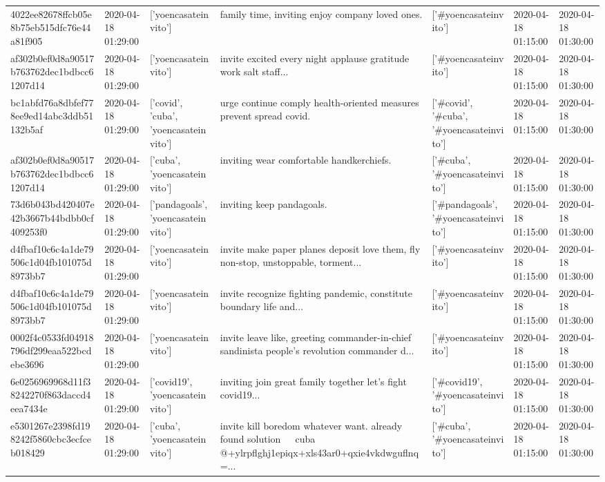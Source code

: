 \begin{tabular}{lllllll}
4022ee82678ffcb05e8b75eb515dfc76e44a81f905 & 2020-04-18 01:29:00 & ['yoencasateinvito'] & family time, inviting enjoy company loved ones. & ['#yoencasateinvito'] & 2020-04-18 01:15:00 & 2020-04-18 01:30:00 \\
af302b0ef0d8a90517b763762dec1bdbcc61207d14 & 2020-04-18 01:29:00 & ['yoencasateinvito'] & invite excited every night applause gratitude work salt staff... & ['#yoencasateinvito'] & 2020-04-18 01:15:00 & 2020-04-18 01:30:00 \\
bc1abfd76a8dbfef778ee9ed14abc3ddb51132b5af & 2020-04-18 01:29:00 & ['covid', 'cuba', 'yoencasateinvito'] & urge continue comply health-oriented measures prevent spread covid. & ['#covid', '#cuba', '#yoencasateinvito'] & 2020-04-18 01:15:00 & 2020-04-18 01:30:00 \\
af302b0ef0d8a90517b763762dec1bdbcc61207d14 & 2020-04-18 01:29:00 & ['cuba', 'yoencasateinvito'] & inviting wear comfortable handkerchiefs. & ['#cuba', '#yoencasateinvito'] & 2020-04-18 01:15:00 & 2020-04-18 01:30:00 \\
73d6b043bd420407e42b3667b44bdbb0cf409253f0 & 2020-04-18 01:29:00 & ['pandagoals', 'yoencasateinvito'] & inviting keep pandagoals. & ['#pandagoals', '#yoencasateinvito'] & 2020-04-18 01:15:00 & 2020-04-18 01:30:00 \\
d4fbaf10c6c4a1de79506c1d04fb101075d8973bb7 & 2020-04-18 01:29:00 & ['yoencasateinvito'] & invite make paper planes deposit love them, fly non-stop, unstoppable, torment... & ['#yoencasateinvito'] & 2020-04-18 01:15:00 & 2020-04-18 01:30:00 \\
d4fbaf10c6c4a1de79506c1d04fb101075d8973bb7 & 2020-04-18 01:29:00 & ['yoencasateinvito'] & invite recognize fighting pandemic, constitute boundary life and... & ['#yoencasateinvito'] & 2020-04-18 01:15:00 & 2020-04-18 01:30:00 \\
0002f4c0533fd04918796df299eaa522bcdebe3696 & 2020-04-18 01:29:00 & ['yoencasateinvito'] & invite leave like, greeting commander-in-chief sandinista people's revolution commander d... & ['#yoencasateinvito'] & 2020-04-18 01:15:00 & 2020-04-18 01:30:00 \\
6e0256969968d11f38242270f863daccd4eea7434e & 2020-04-18 01:29:00 & ['covid19', 'yoencasateinvito'] & inviting join great family together let's fight covid19... & ['#covid19', '#yoencasateinvito'] & 2020-04-18 01:15:00 & 2020-04-18 01:30:00 \\
e5301267e2398fd198242f5860cbc3ecfceb018429 & 2020-04-18 01:29:00 & ['cuba', 'yoencasateinvito'] & invite kill boredom whatever want. already found solution 🤣🤣🤣 cuba @+ylrpflghj1epiqx+xls43ar0+qxie4vkdwguflnq=... & ['#cuba', '#yoencasateinvito'] & 2020-04-18 01:15:00 & 2020-04-18 01:30:00 \\

\end{tabular}
